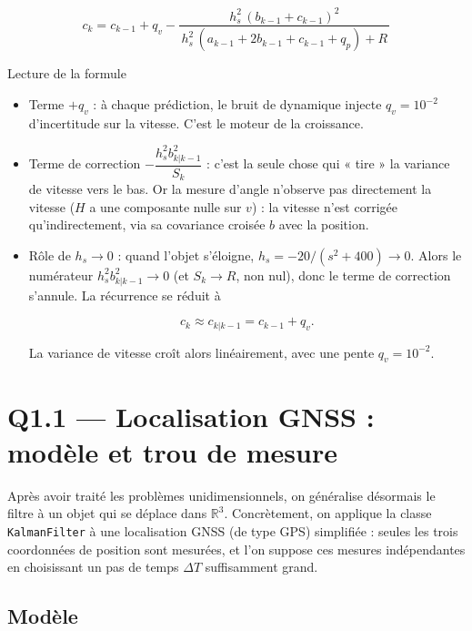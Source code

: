 \documentclass[11pt]{article}
\theoremstyle{remark}
\theoremstyle{definition}
\begin{document}
\begin{equation}
\boxed{\,c_k = c_{k-1} + q_v - \frac{h_s^2\,(b_{k-1} + c_{k-1})^2}{\,h_s^2\,(a_{k-1} + 2b_{k-1} + c_{k-1} + q_p) + R\,}\,}
\end{equation}

Lecture de la formule

\begin{itemize}
\item Terme $+q_v$ : à chaque prédiction, le bruit de dynamique injecte $q_v = 10^{-2}$
   d'incertitude sur la vitesse. C'est le moteur de la croissance.

\item Terme de correction $-\dfrac{h_s^2 b_{k|k-1}^2}{S_k}$ : c'est la seule chose qui
   « tire » la variance de vitesse vers le bas. Or la mesure d'angle n'observe pas
   directement la vitesse ($H$ a une composante nulle sur $v$) : la vitesse n'est corrigée
   qu'indirectement, via sa covariance croisée $b$ avec la position.

\item Rôle de $h_s \to 0$ : quand l'objet s'éloigne, $h_s = -20/(s^2+400) \to 0$. Alors
   le numérateur $h_s^2 b_{k|k-1}^2 \to 0$ (et $S_k \to R$, non nul), donc le terme de
   correction s'annule. La récurrence se réduit à

   \begin{equation}
   c_k \approx c_{k|k-1} = c_{k-1} + q_v .
   \end{equation}

   La variance de vitesse croît alors linéairement, avec une pente $q_v = 10^{-2}$.
\end{itemize}

\section{Q1.1 --- Localisation GNSS : modèle et trou de mesure}

Après avoir traité les problèmes unidimensionnels, on généralise désormais le filtre à un
objet qui se déplace dans $\mathbb{R}^3$. Concrètement, on applique la classe
\texttt{KalmanFilter} à une localisation GNSS (de type GPS) simplifiée : seules les
trois coordonnées de position sont mesurées, et l'on suppose ces mesures
indépendantes en choisissant un pas de temps $\Delta T$ suffisamment grand.

\subsection{Modèle}
\end{document}
